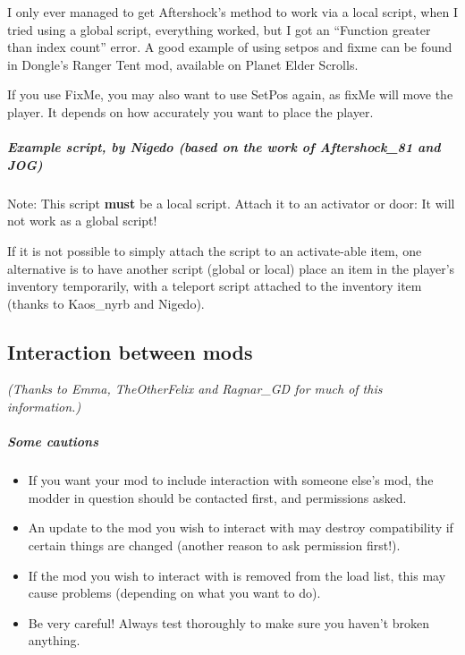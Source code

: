 I only ever managed to get Aftershock's method to work via a local
script, when I tried using a global script, everything worked, but I got
an ``Function greater than index count'' error. A good example of using
setpos and fixme can be found in Dongle's Ranger Tent mod, available on
Planet Elder Scrolls.

If you use FixMe, you may also want to use SetPos again, as fixMe will
move the player. It depends on how accurately you want to place the
player.

\hypertarget{example-script-by-nigedo-based-on-the-work-of-aftershock_81-and-jog}{%
\subparagraph{Example script, by Nigedo (based on the work of
Aftershock\_81 and
JOG)}\label{example-script-by-nigedo-based-on-the-work-of-aftershock_81-and-jog}}

Note: This script \textbf{must} be a local script. Attach it to an
activator or door: It will not work as a global script!



If it is not possible to simply attach the script to an activate-able
item, one alternative is to have another script (global or local) place
an item in the player's inventory temporarily, with a teleport script
attached to the inventory item (thanks to Kaos\_nyrb and Nigedo).

\hypertarget{interaction-between-mods}{%
\subsection{\texorpdfstring{\hfill\break
Interaction between
mods}{ Interaction between mods}}\label{interaction-between-mods}}

\emph{(Thanks to Emma, TheOtherFelix and Ragnar\_GD for much of this
information.)}

\hypertarget{some-cautions}{%
\subparagraph{Some cautions}\label{some-cautions}}

\begin{itemize}
\item
  If you want your mod to include interaction with someone else's mod,
  the modder in question should be contacted first, and permissions
  asked.
\item
  An update to the mod you wish to interact with may destroy
  compatibility if certain things are changed (another reason to ask
  permission first!).
\item
  If the mod you wish to interact with is removed from the load list,
  this may cause problems (depending on what you want to do).
\item
  Be very careful! Always test thoroughly to make sure you haven't
  broken anything.
\end{itemize}

